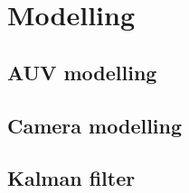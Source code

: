 \chapter{Modelling}


\section{AUV modelling}



\section{Camera modelling}



\section{Kalman filter}